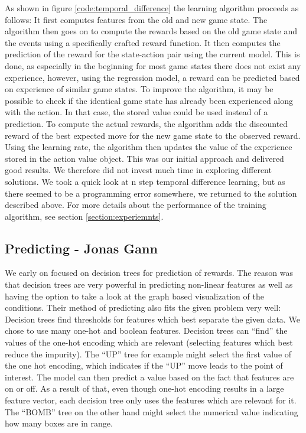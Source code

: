 \documentclass{article}
\begin{document}
As shown in figure \ref{code:temporal_difference} the learning algorithm proceeds as follows: It first computes features from the old and new game state. The algorithm then goes on to compute the rewards based on the old game state and the events using a specifically crafted reward function.
It then computes the prediction of the reward for the state-action pair using the current model. This is done, as especially in the beginning for most game states there does not exist any experience, however, using the regression model, a reward can be predicted based on experience of similar game states. To improve the algorithm, it may be possible to check if the identical game state has already been experienced along with the action. In that case, the stored value could be used instead of a prediction. To compute the actual rewards, the algorithm adds the discounted reward of the best expected move for the new game state to the observed reward. Using the learning rate, the algorithm then updates the value of the experience stored in the action value object. This was our initial approach and delivered good results. We therefore did not invest much time in exploring different solutions. We took a quick look at n step temporal difference learning, but as there seemed to be a programming error somewhere, we returned to the solution described above. For more details about the performance of the training algorithm, see section \ref{section:experiemnts}.

\subsection[Predicting]{Predicting {\small - Jonas Gann}}

We early on focused on decision trees for prediction of rewards. The reason was that decision trees are very powerful in predicting non-linear features as well as having the option to take a look at the graph based visualization of the conditions. Their method of predicting also fits the given problem very well: Decision trees find thresholds for features which best separate the given data. We chose to use many one-hot and boolean features. Decision trees can “find” the values of the one-hot encoding which are relevant (selecting features which best reduce the impurity). 
The “UP” tree for example might select the first value of the one hot encoding, which indicates if the “UP” move leads to the point of interest. 
The model can then predict a value based on the fact that features are on or off. As a result of that, even though one-hot encoding results in a large feature vector, each decision tree only uses the features which are relevant for it.
The “BOMB” tree on the other hand might select the numerical value indicating how many boxes are in range.
\end{document}
